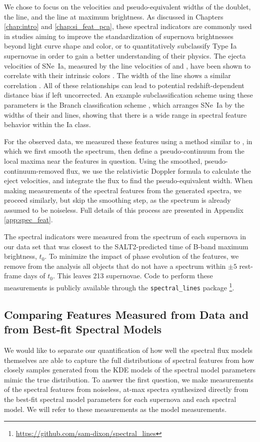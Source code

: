 We chose to focus on the velocities and pseudo-equivalent widths of the \CaIIHK{} {} doublet, the \SiIIblue{} line, and the \SiIIred{} line at maximum brightness. As discussed in Chapters \ref{chap:intro} and \ref{chap:si_feat_pca}, these spectral indicators are commonly used in studies aiming to improve the standardization of supernova brightnesses beyond light curve shape and color, or to quantitatively subclassify Type Ia supernovae in order to gain a better understanding of their physics. The ejecta velocities of SNe~Ia, measured by the line velocities of \SiIIred{} and \CaIIHK{} {}, have been shown to correlate with their intrinsic colors \citep{foley_measuring_2011, foley_velocity_2011, foley_relation_2012, mandel_type_2014}. The width of the \SiIIred{} line shows a similar correlation \citep{foley_velocity_2011}. All of these relationships can lead to potential redshift-dependent distance bias if left uncorrected. An example subclassification scheme using these parameters is the Branch classification scheme \citep{branch_comparative_2006}, which arranges SNe~Ia by the widths of their \SiIIblue{} and \SiIIred{} lines, showing that there is a wide range in spectral feature behavior within the Ia class. 

For the observed data, we measured these features using a method similar to \cite{blondin_using_2006}, in which we first smooth the spectrum, then define a pseudo-continuum from the local maxima near the features in question. Using the smoothed, pseudo-continuum-removed flux, we use the relativistic Doppler formula to calculate the eject velocities, and integrate the flux to find the pseudo-equivalent width. When making measurements of the spectral features from the generated spectra, we proceed similarly, but skip the smoothing step, as the spectrum is already assumed to be noiseless. Full details of this process are presented in Appendix \ref{app:spec_feat}. 

The spectral indicators were measured from the spectrum of each supernova in our data set that was closest to the SALT2-predicted time of B-band maximum brightness, $t_0$. To minimize the impact of phase evolution of the features, we remove from the analysis all objects that do not have a spectrum within $\pm 5$ rest-frame days of $t_0$. This leaves 213 supernovae. Code to perform these measurements is publicly available through the \verb|spectral_lines| package \footnote{\url{https://github.com/sam-dixon/spectral_lines}}.

\subsection{Comparing Features Measured from Data and from Best-fit Spectral Models}
We would like to separate our quantification of how well the spectral flux models themselves are able to capture the full distributions of spectral features from how closely samples generated from the KDE models of the spectral model parameters mimic the true distribution. To answer the first question, we make measurements of the spectral features from noiseless, at-max spectra synthesized directly from the best-fit spectral model parameters for each supernova and each spectral model. We will refer to these measurements as the model measurements.

